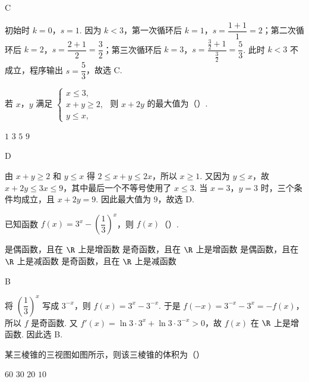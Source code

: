 \begin{answer}
C
\end{answer}

\begin{solution}
初始时 \(k=0\)，\(s=1\). 因为 \(k<3\)，第一次循环后 \(k=1\)，\(s=\dfrac{1+1}{1}=2\)；第二次循环后 \(k=2\)，\(s=\dfrac{2+1}{2}=\dfrac32\)；第三次循环后 \(k=3\)，\(s=\dfrac{\frac32+1}{\frac32}=\dfrac53\).
此时 \(k<3\) 不成立，程序输出 \(s=\dfrac53\)，故选 C.
\end{solution}

\begin{problem}
若 \(x\)，\(y\) 满足 \(\begin{cases}
x\le3,\\
x+y\ge2,\\
y\le x,
\end{cases}\) 则 \(x+2y\) 的最大值为（\quad）.

\choices
    {\(1\)}
    {\(3\)}
    {\(5\)}
    {\(9\)}
\end{problem}

\begin{answer}
D
\end{answer}

\begin{solution}
由 \(x+y\ge2\) 和 \(y\le x\) 得 \(2\le x+y\le2x\)，所以 \(x\ge1\). 又因为 \(y\le x\)，故 \(x+2y\le3x\le9\)，其中最后一个不等号使用了 \(x\le3\).
当 \(x=3\)，\(y=3\) 时，三个条件均成立，且 \(x+2y=9\). 因此最大值为 \(9\)，故选 D.
\end{solution}

\begin{problem}
已知函数 \(f(x)=3^x-\left(\dfrac13\right)^x\)，则 \(f(x)\)（\quad）.

\choices
    {是偶函数，且在 \(\R\) 上是增函数}
    {是奇函数，且在 \(\R\) 上是增函数}
    {是偶函数，且在 \(\R\) 上是减函数}
    {是奇函数，且在 \(\R\) 上是减函数}
\end{problem}

\begin{answer}
B
\end{answer}

\begin{solution}
将 \(\left(\dfrac13\right)^x\) 写成 \(3^{-x}\)，则 \(f(x)=3^x-3^{-x}\). 于是 \(f(-x)=3^{-x}-3^x=-f(x)\)，所以 \(f\) 是奇函数.
又 \(f'(x)=\ln3\cdot3^x+\ln3\cdot3^{-x}>0\)，故 \(f(x)\) 在 \(\R\) 上是增函数. 因此选 B.
\end{solution}

\begin{problem}
某三棱锥的三视图如图所示，则该三棱锥的体积为（\quad）

\FloatBarrier

\choices
    {\(60\)}
    {\(30\)}
    {\(20\)}
    {\(10\)}
\end{problem}

